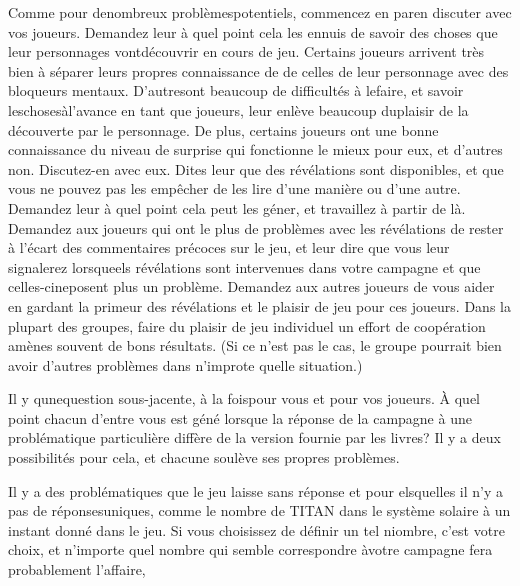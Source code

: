 Comme pour denombreux problèmespotentiels, commencez en paren discuter avec vos joueurs. Demandez leur à quel point cela les ennuis de savoir des choses que leur personnages vontdécouvrir en cours de jeu. Certains joueurs arrivent très bien à séparer leurs propres connaissance de de celles de leur personnage avec des bloqueurs mentaux. D'autresont beaucoup de difficultés à lefaire, et savoir leschosesàl'avance en tant que joueurs, leur enlève beaucoup duplaisir de la découverte par le personnage. De plus, certains joueurs ont une bonne connaissance du niveau de surprise qui fonctionne le mieux pour eux, et d'autres non. Discutez-en avec eux. Dites leur que des révélations sont disponibles, et que vous ne pouvez pas les empêcher de les lire d'une manière ou d'une autre. Demandez leur à quel point cela peut les géner, et travaillez à partir de là. Demandez aux joueurs qui ont le plus de problèmes avec les révélations de rester à l'écart des commentaires précoces sur le jeu, et leur dire que vous leur signalerez lorsqueels révélations sont intervenues dans votre campagne et que celles-cineposent plus un problème. Demandez aux autres joueurs de vous aider en gardant la primeur des révélations et le plaisir de jeu pour ces joueurs. Dans la plupart des groupes, faire du plaisir de jeu individuel un effort de coopération amènes souvent de bons résultats. (Si ce n'est pas le cas, le groupe pourrait bien avoir d'autres problèmes dans n'improte quelle situation.) 

Il y qunequestion sous-jacente, à la foispour vous et pour vos joueurs. À quel point chacun d'entre vous est géné lorsque la réponse de la campagne à une problématique particulière diffère de la version fournie par les livres? Il y a deux possibilités pour cela, et chacune soulève ses propres problèmes. 

Il y a des problématiques que le jeu laisse sans réponse et pour elsquelles il n'y a pas de réponsesuniques, comme le nombre de TITAN dans le système solaire à un instant donné dans le jeu. Si vous choisissez de définir un tel niombre, c'est votre choix, et n'importe quel nombre qui semble correspondre àvotre campagne fera probablement l'affaire, 

